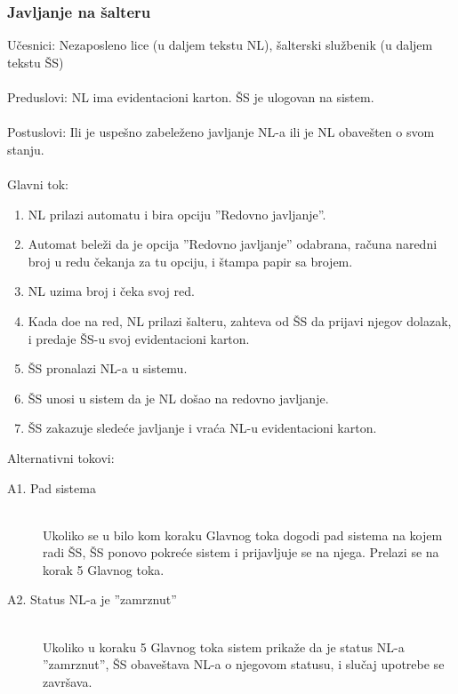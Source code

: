\subsubsection{Javljanje na \v salteru}
\label{su: javljanje na salteru}

\noindent U\v cesnici: Nezaposleno lice (u daljem tekstu NL), \v salterski slu\v zbenik (u daljem tekstu \v SS)
\\
\\ Preduslovi: NL ima evidentacioni karton. \v SS je ulogovan na sistem. 
\\
\\ Postuslovi: Ili je uspe\v sno zabele\v zeno javljanje NL-a ili je NL obave\v sten o svom stanju.
\\ 
\\ Glavni tok:
\begin{enumerate}
	\item NL prilazi automatu i bira opciju ''Redovno javljanje''.
	\item Automat bele\v zi da je opcija ''Redovno javljanje'' odabrana, ra\v cuna naredni broj u redu \v cekanja za tu opciju, i \v stampa papir sa brojem.
	\item NL uzima broj i \v ceka svoj red.
	\item Kada do\dj e na red, NL prilazi \v salteru, zahteva od \v SS da prijavi njegov dolazak, i predaje \v SS-u svoj evidentacioni karton.
	\item \v SS pronalazi NL-a u sistemu.
	\item \v SS unosi u sistem da je NL do\v sao na redovno javljanje.
	\item \v SS zakazuje slede\' ce javljanje i vra\' ca NL-u evidentacioni karton.
\end{enumerate}

\noindent Alternativni tokovi: 
\begin{description}
	\item[A1. Pad sistema] ~\\
	Ukoliko se u bilo kom koraku Glavnog toka dogodi pad sistema na kojem radi \v SS, \v SS ponovo pokre\'ce sistem i prijavljuje se na njega. Prelazi se na korak 5 Glavnog toka.
	
	\item[A2. Status NL-a je ''zamrznut''] ~\\
	Ukoliko u koraku 5 Glavnog toka sistem prika\v ze da je status NL-a ''zamrznut'', \v SS obave\v stava NL-a o njegovom statusu, i slu\v caj upotrebe se zavr\v sava.
\end{description}

